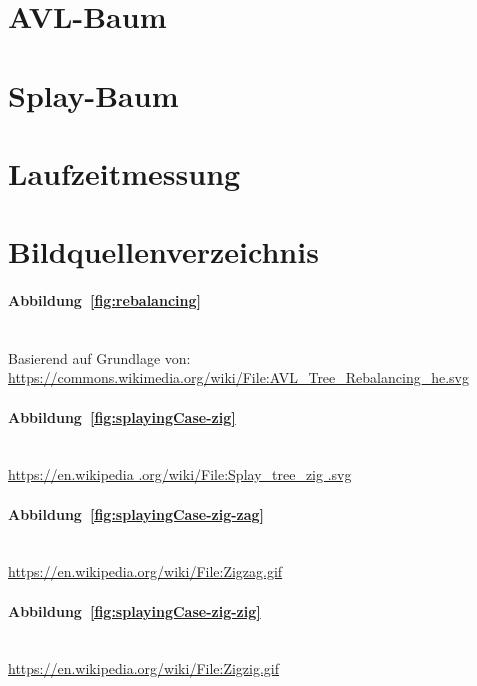 \documentclass[a4paper]{article}
\begin{document}
    \section{AVL-Baum}\label{sec:avl-tree}
    

    \FloatBarrier
    \newpage

    \section{Splay-Baum}\label{sec:splay-tree}
    

    \FloatBarrier
    \newpage

    \section{Laufzeitmessung}\label{sec:laufzeitmessung}
    

    \FloatBarrier
    \newpage
    \appendix

    \section{Bildquellenverzeichnis}\label{sec:bildquellen}

    \paragraph{Abbildung~\ref{fig:rebalancing}}\mbox{}\\

    Basierend auf Grundlage von:\\
    \url{https://commons.wikimedia.org/wiki/File:AVL_Tree_Rebalancing_he.svg}

    \paragraph{Abbildung~\ref{fig:splayingCase-zig}}\mbox{}\\

    \url{https://en.wikipedia .org/wiki/File:Splay_tree_zig .svg}

    \paragraph{Abbildung~\ref{fig:splayingCase-zig-zag}}\mbox{}\\

    \url{https://en.wikipedia.org/wiki/File:Zigzag.gif}

    \paragraph{Abbildung~\ref{fig:splayingCase-zig-zig}}\mbox{}\\

    \url{https://en.wikipedia.org/wiki/File:Zigzig.gif}

    
\end{document}
